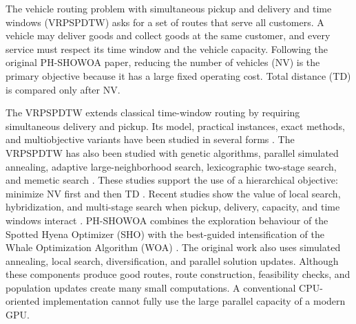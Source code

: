 \documentclass[pdflatex,sn-mathphys-num]{sn-jnl}
\begin{document}
The vehicle routing problem with simultaneous pickup and delivery and time windows (VRPSPDTW) asks for a set of routes that serve all customers. A vehicle may deliver goods and collect goods at the same customer, and every service must respect its time window and the vehicle capacity. Following the original PH-SHOWOA paper, reducing the number of vehicles (NV) is the primary objective because it has a large fixed operating cost. Total distance (TD) is compared only after NV.

The VRPSPDTW extends classical time-window routing \cite{solomon1987algorithms,laporte2009fifty} by requiring simultaneous delivery and pickup. Its model, practical instances, exact methods, and multiobjective variants have been studied in several forms \cite{angelelli2002vrpspdtw,wang2015multiobjective,praxe2024exact}. The VRPSPDTW has also been studied with genetic algorithms, parallel simulated annealing, adaptive large-neighborhood search, lexicographic two-stage search, and memetic search \cite{wang2012ga,wang2015psa,hof2019alns,shi2020lexicographic,liu2021memetic,lei2025memetic}. These studies support the use of a hierarchical objective: minimize NV first and then TD \cite{wang2015psa,shi2020lexicographic}. Recent studies show the value of local search, hybridization, and multi-stage search when pickup, delivery, capacity, and time windows interact \cite{wu2023aco,liu2023hybrid,zhang2025multistage,mu2016parallel,voigt2025alns}. PH-SHOWOA combines the exploration behaviour of the Spotted Hyena Optimizer (SHO) with the best-guided intensification of the Whale Optimization Algorithm (WOA) \cite{dhiman2017sho,mirjalili2016woa,gharehchopogh2019woasurvey,utama2023hsho,zhou2024whalerouting,nguyen2026phshowoa}. The original work also uses simulated annealing, local search, diversification, and parallel solution updates. Although these components produce good routes, route construction, feasibility checks, and population updates create many small computations. A conventional CPU-oriented implementation cannot fully use the large parallel capacity of a modern GPU.
\end{document}
